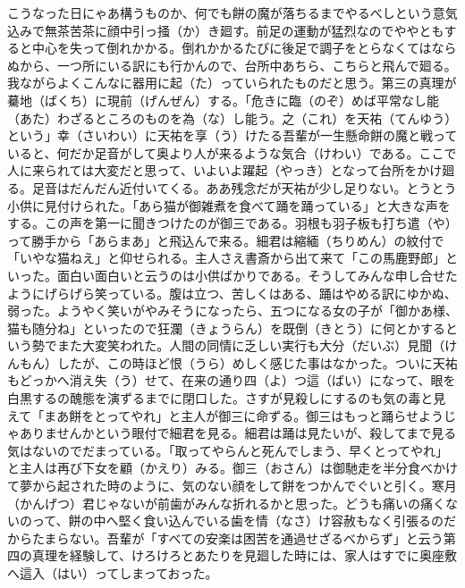 \documentclass{book}
\begin{document}
こうなった日にゃあ構うものか、何でも餅の魔が落ちるまでやるべしという意気込みで無茶苦茶に顔中引っ掻（か）き廻す。前足の運動が猛烈なのでややともすると中心を失って倒れかかる。倒れかかるたびに後足で調子をとらなくてはならぬから、一つ所にいる訳にも行かんので、台所中あちら、こちらと飛んで廻る。我ながらよくこんなに器用に起（た）っていられたものだと思う。第三の真理が驀地（ばくち）に現前（げんぜん）する。「危きに臨（のぞ）めば平常なし能（あた）わざるところのものを為（な）し能う。之（これ）を天祐（てんゆう）という」幸（さいわい）に天祐を享（う）けたる吾輩が一生懸命餅の魔と戦っていると、何だか足音がして奥より人が来るような気合（けわい）である。ここで人に来られては大変だと思って、いよいよ躍起（やっき）となって台所をかけ廻る。足音はだんだん近付いてくる。ああ残念だが天祐が少し足りない。とうとう小供に見付けられた。「あら猫が御雑煮を食べて踊を踊っている」と大きな声をする。この声を第一に聞きつけたのが御三である。羽根も羽子板も打ち遣（や）って勝手から「あらまあ」と飛込んで来る。細君は縮緬（ちりめん）の紋付で「いやな猫ねえ」と仰せられる。主人さえ書斎から出て来て「この馬鹿野郎」といった。面白い面白いと云うのは小供ばかりである。そうしてみんな申し合せたようにげらげら笑っている。腹は立つ、苦しくはある、踊はやめる訳にゆかぬ、弱った。ようやく笑いがやみそうになったら、五つになる女の子が「御かあ様、猫も随分ね」といったので狂瀾（きょうらん）を既倒（きとう）に何とかするという勢でまた大変笑われた。人間の同情に乏しい実行も大分（だいぶ）見聞（けんもん）したが、この時ほど恨（うら）めしく感じた事はなかった。ついに天祐もどっかへ消え失（う）せて、在来の通り四（よ）つ這（ばい）になって、眼を白黒するの醜態を演ずるまでに閉口した。さすが見殺しにするのも気の毒と見えて「まあ餅をとってやれ」と主人が御三に命ずる。御三はもっと踊らせようじゃありませんかという眼付で細君を見る。細君は踊は見たいが、殺してまで見る気はないのでだまっている。「取ってやらんと死んでしまう、早くとってやれ」と主人は再び下女を顧（かえり）みる。御三（おさん）は御馳走を半分食べかけて夢から起された時のように、気のない顔をして餅をつかんでぐいと引く。寒月（かんげつ）君じゃないが前歯がみんな折れるかと思った。どうも痛いの痛くないのって、餅の中へ堅く食い込んでいる歯を情（なさ）け容赦もなく引張るのだからたまらない。吾輩が「すべての安楽は困苦を通過せざるべからず」と云う第四の真理を経験して、けろけろとあたりを見廻した時には、家人はすでに奥座敷へ這入（はい）ってしまっておった。
\end{document}
